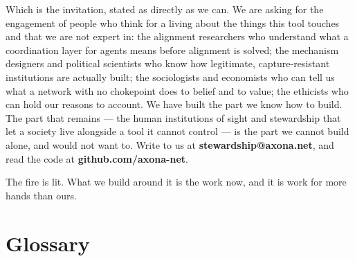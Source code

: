 \documentclass[nobib,justified]{tufte-handout}
\begin{document}
Which is the invitation, stated as directly as we can. We are asking for the
engagement of people who think for a living about the things this tool touches and
that we are not expert in: the alignment researchers who understand what a
coordination layer for agents means before alignment is solved; the mechanism
designers and political scientists who know how legitimate, capture-resistant
institutions are actually built; the sociologists and economists who can tell us
what a network with no chokepoint does to belief and to value; the ethicists who
can hold our reasons to account. We have built the part we know how to build. The
part that remains --- the human institutions of sight and stewardship that let a
society live alongside a tool it cannot control --- is the part we cannot build
alone, and would not want to. Write to us at \textbf{stewardship@axona.net}, and
read the code at \textbf{github.com/axona-net}.

The fire is lit. What we build around it is the work now, and it is work for more
hands than ours.


\section{Glossary}
\end{document}
